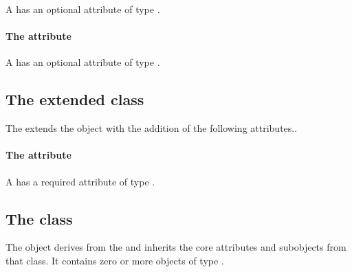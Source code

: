 A \DiffusionCoefficient has an optional attribute
 of type .


\paragraph{The \fixttspace{} attribute}

A \DiffusionCoefficient has an optional attribute
 of type .


\subsection{The extended  class}
\label{extended-reaction-class}




The \SpatialProcessesPackage extends the  object with
the addition of
the following attributes..

\paragraph{The \fixttspace{} attribute}

A \Reaction has a required attribute  of type
.


\subsection{The  class}
\label{listofdomaintypes-class}


The \ListOfDomainTypes object derives from the  and
inherits the core attributes and subobjects from that class. It contains
zero or more objects of type \DomainType.

